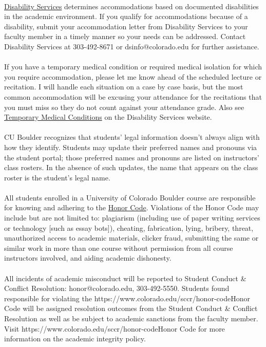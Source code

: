 \documentclass[11pt]{article}
\begin{document}
\\
\href{https://www.colorado.edu/disabilityservices/}{Disability Services} determines accommodations based on documented disabilities in the academic environment. If you qualify for accommodations because of a disability, submit your accommodation letter from Disability Services to your faculty member in a timely manner so your needs can be addressed. Contact Disability Services at 303-492-8671 or dsinfo@colorado.edu for further assistance.\\
\\
If you have a temporary medical condition or required medical isolation for which you require accommodation, please let me know ahead of the scheduled lecture or recitation.  I will handle each situation on a case by case basis, but the most common accommodation will be excusing your attendance for the recitations that you must miss so they do not count against your attendance grade.  Also see \href{https://www.colorado.edu/disabilityservices/students/temporary-medical-conditions}{Temporary Medical Conditions} on the Disability Services website.\\

\\
CU Boulder recognizes that students' legal information doesn't always align with how they identify. Students may update their preferred names and pronouns via the student portal; those preferred names and pronouns are listed on instructors' class rosters. In the absence of such updates, the name that appears on the class roster is the student's legal name.\\
\newpage
{}\\
All students enrolled in a University of Colorado Boulder course are responsible for knowing and adhering to the \href{https://www.colorado.edu/sccr/honor-code}{Honor Code}. Violations of the Honor Code may include but are not limited to: plagiarism (including use of paper writing services or technology [such as essay bots]), cheating, fabrication, lying, bribery, threat, unauthorized access to academic materials, clicker fraud, submitting the same or similar work in more than one course without permission from all course instructors involved, and aiding academic dishonesty.\\
\\
All incidents of academic misconduct will be reported to Student Conduct & Conflict Resolution: honor@colorado.edu, 303-492-5550. Students found responsible for violating the {https://www.colorado.edu/sccr/honor-code}{Honor Code} will be assigned resolution outcomes from the Student Conduct & Conflict Resolution as well as be subject to academic sanctions from the faculty member. Visit {https://www.colorado.edu/sccr/honor-code}{Honor Code} for more information on the academic integrity policy.\\
\end{document}
